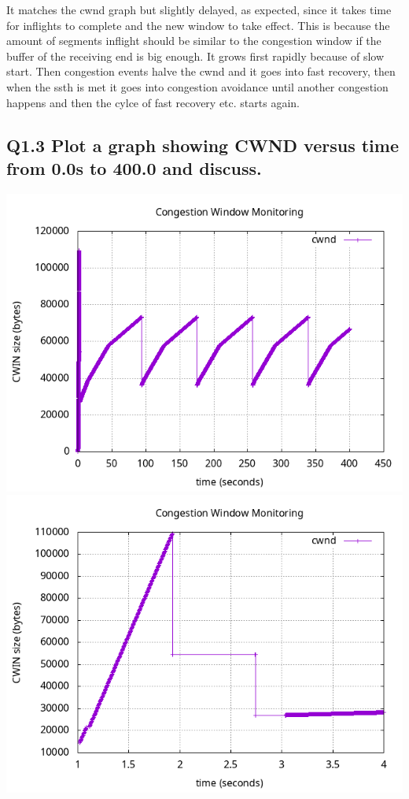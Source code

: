 \documentclass{article}
\begin{document}
It matches the cwnd graph but slightly delayed, as expected, since it takes time for inflights to complete and the new window to take effect. This is because the amount of segments inflight should be similar to the congestion window if the buffer of the receiving end is big enough. It grows first rapidly because of slow start. Then congestion events halve the cwnd and it goes into fast recovery, then when the ssth is met it goes into congestion avoidance until another congestion happens and then the cylce of fast recovery etc. starts again.


\subsection{Q1.3 Plot a graph showing CWND versus time from 0.0s to 400.0 and discuss.}

\includegraphics[scale=0.5]{plots/lab1-group5-task1-question1.3.png}
\includegraphics[scale=0.5]{plots/lab1-group5-task1-question1.3-xrange-1-4.png}
\end{document}
